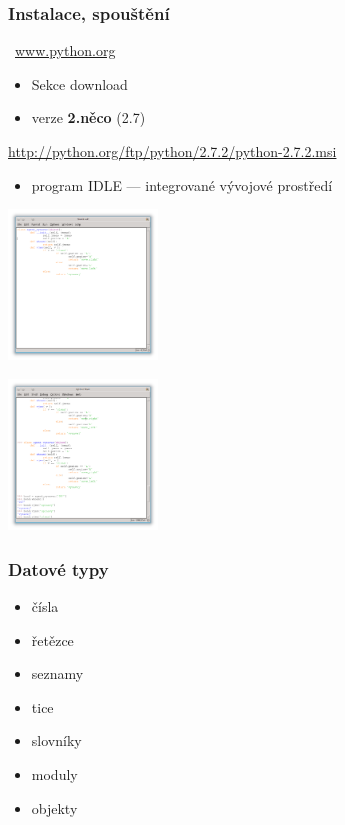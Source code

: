 \documentclass[red,handout,professionalfont]{beamer}
\theoremstyle{definition}
\newcommand{\0}{\mbox{${\bf 0}$}}
\renewcommand{\emph}[1]{{\bf #1}}
\begin{document}
\begin{frame}\frametitle{Instalace, spouštění}
 \begin{block}{}
\ \hfill \url{www.python.org}\hfill\
\end{block}
\begin{itemize}
 \item Sekce download
 \item verze \emph{2.něco} (2.7)
\end{itemize}
\begin{center}
\url{http://python.org/ftp/python/2.7.2/python-2.7.2.msi}
\end{center}\pause
\begin{itemize}
 \item program IDLE --- integrované vývojové prostředí \pause
\end{itemize}
\begin{center}
\begin{minipage}{4cm}
 \includegraphics[height=4cm]{idle-screenshot-editor.png}
\end{minipage}
\begin{minipage}{4cm}
 \includegraphics[height=4cm]{idle-screenshot-interpreter.png}
\end{minipage}
\end{center}
\end{frame}

\begin{frame}[fragile]\frametitle{Datové typy}
 \begin{itemize}
  \item čísla\pause
  \item řetězce\pause
  \item seznamy\pause
  \item tice\pause
  \item slovníky\pause
  \item moduly\pause
  \item objekty
 \end{itemize}
\end{frame}
\end{document}
